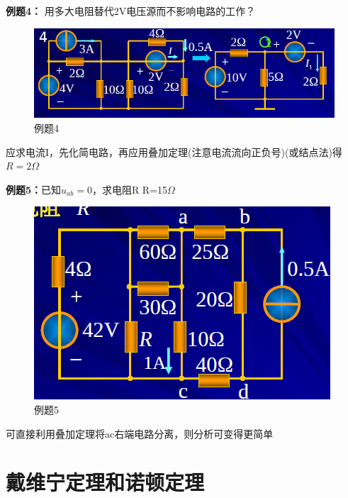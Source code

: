 \documentclass[11pt,a4paper,oneside]{book}
\begin{document}
\noindent\textbf{例题4：}
用多大电阻替代2V电压源而不影响电路的工作？
\begin{figure}[H]
	\centering
	\includegraphics[width=0.7\linewidth]{screenshot062}
	\caption{例题4}
	\label{fig:screenshot062}
\end{figure}
应求电流I，先化简电路，再应用叠加定理(注意电流流向正负号)(或结点法)得$R=2\Omega$

\noindent\textbf{例题5：}已知$u_{ab}=0$，求电阻R \quad R=15$\Omega$
\begin{figure}[H]
	\centering
	\includegraphics[width=0.5\linewidth]{screenshot063}
	\caption{例题5}
	\label{fig:screenshot063}
\end{figure}
可直接利用叠加定理将ac右端电路分离，则分析可变得更简单

\section{戴维宁定理和诺顿定理}
\end{document}
